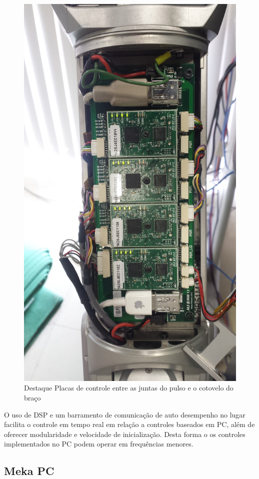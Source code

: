\begin{figure}[H]
    \centering
    \includegraphics[width = 0.8\linewidth]{figs/dsp-control-wrist}
    \caption{Destaque Placas de controle entre as juntas do pulso e o cotovelo do braço}
    \label{fig:dsp-control-wrist}
\end{figure}

O uso de DSP e um barramento de comunicação de auto desempenho no lugar facilita o controle em tempo real em relação a controles baseados em PC, além de oferecer modularidade e velocidade de inicialização\cite{edsinger2004domo}. Desta forma o os controles implementados no PC podem operar em frequências menores.


\subsection{Meka PC}

